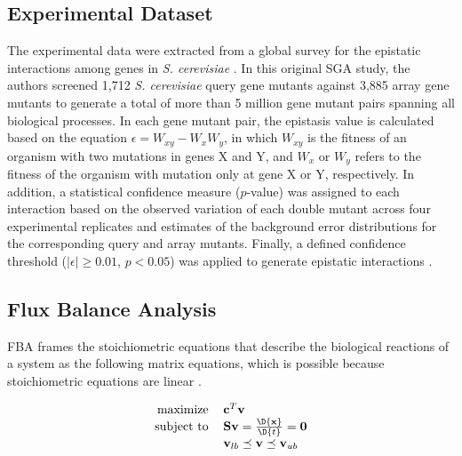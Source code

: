 \subsection{Experimental Dataset}
The experimental data were extracted from a global survey for the
epistatic interactions among genes in \textit{S. cerevisiae} \citep{Costanzo2010}. In
this original SGA study, the authors screened 1,712 \textit{S. cerevisiae}
query gene mutants against 3,885 array gene mutants to generate a
total of more than 5 million gene mutant pairs spanning all biological
processes. In each gene mutant pair, the epistasis value is calculated
based on the equation $\epsilon = W_{xy} − W_xW_y$, in which $W_{xy}$
is the fitness of an organism with two mutations in genes X and Y, and
$W_x$ or $W_y$ refers to the fitness of the organism with mutation
only at gene X or Y, respectively. In addition, a statistical
confidence measure ($p$-value) was assigned to each interaction based on
the observed variation of each double mutant across four experimental
replicates and estimates of the background error distributions for the
corresponding query and array mutants. Finally, a defined confidence
threshold ($\left|\epsilon\right| \geq 0.01$, $p < 0.05$) was applied
to generate epistatic interactions \citep{Costanzo2010}.

\subsection{Flux Balance Analysis}

FBA frames the stoichiometric equations that describe the biological
reactions of a system as the following matrix equations, which is
possible because stoichiometric equations are linear \citep{Mo2009,
Becker2007, Smallbone2009a}.

\begin{equation}
\centering
\begin{tabular}{rl}
maximize   & $\mathbf{c}^T\mathbf{v}$                                     \\
subject to & $\mathbf{S v} = \frac{\D{\mathbf{x}}}{\D{t}} = \mathbf{0}$   \\
           & $\mathbf{v}_{lb} \preceq \mathbf{v} \preceq \mathbf{v}_{ub}$ \\
\end{tabular}
\end{equation}

